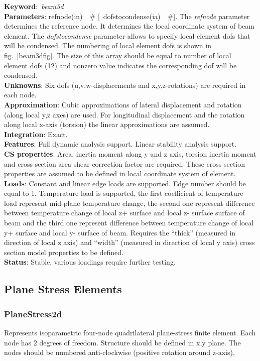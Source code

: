 \documentclass[12pt,dvips]{article}
\newcommand{\descitem}[1]{{\noindent \bf #1}:}
\newcommand{\elemkeyword}[1]{\descitem{Keyword}~{\em #1}}
\newcommand{\elemparam}[2]{{{#1\tiny (#2)}~~\#}}
\newcommand{\optelemparam}[2]{{[~\elemparam{#1}{#2}]}}
\newcommand{\param}[1]{{\it #1}}
\begin{document}
\elemkeyword{beam3d}\\
\descitem{Parameters} \elemparam{refnode}{in}
\optelemparam{dofstocondense}{ia}. The \param{refnode} parameter
determines the reference node. It determines the local coordinate
system of beam element. The \param{dofstocondense} parameter allows to
specify local element dofs that will be condensed. The numbering of
local element dofs is shown in fig.~\ref{beam3dfig}. The size of this
array should be equal to number of local element dofs (12) and nonzero
value indicates the corresponding dof will be condensed.\\
\descitem{Unknowns}
Six dofs (u,v,w-displacements and x,y,z-rotations) are required in each node.\\
\descitem{Approximation} Cubic  approximations of lateral displacement and
rotation (along local y,z axes) are used. For longitudinal displacement
and the rotation along local x-axis (torsion) the linear
approximations are assumed.\\
\descitem{Integration} Exact.\\
\descitem{Features} Full dynamic analysis support. Linear stability
analysis support.\\
\descitem{CS properties} Area, inertia moment along y and z axis, torsion inertia moment and 
cross section area shear correction factor are required. These
cross section properties are assumed to be defined in local coordinate
system of element.\\
\descitem{Loads}  Constant and linear edge loads are supported.
Edge number should be equal to 1. Temperature load is
supported, the first coefficient of temperature load represent
mid-plane temperature change, the second one represent difference
between temperature change of local z+ surface and local
z- surface surface of beam and the third one represent difference
between temperature change of local y+ surface and  local
y- surface of beam. Requires the ``thick'' (measured in direction of
local z axis) and ``width'' (measured in direction of local y axis) cross section
model properties to be defined.\\
\descitem{Status} Stable, various loadings require further testing.

\subsection{Plane Stress Elements}
\subsubsection{PlaneStress2d}
Represents isoparametric four-node quadrilateral plane-stress
finite element. Each node has 2 degrees of freedom.
Structure should be defined in x,y plane. 
The nodes should be numbered anti-clockwise (positive rotation around
z-axis). 
\end{document}
